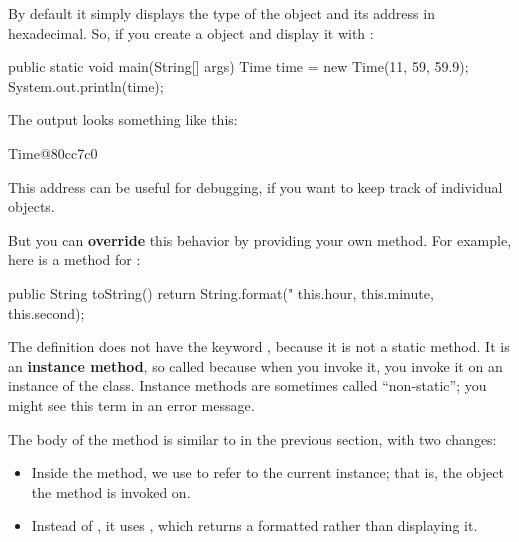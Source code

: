 
By default it simply displays the type of the object and its address in hexadecimal. 
So, if you create a  object and display it with :

\begin{code}
public static void main(String[] args) {
    Time time = new Time(11, 59, 59.9);
    System.out.println(time);
}
\end{code}


The output looks something like this:

\begin{stdout}
Time@80cc7c0
\end{stdout}


This address can be useful for debugging, if you want to keep track of individual objects.


But you can {\bf override} this behavior by providing your own  method.
For example, here is a  method for :

\begin{code}
public String toString() {
    return String.format("%
        this.hour, this.minute, this.second);
}
\end{code}


The definition does not have the keyword , because it is not a static method.
It is an {\bf instance method}, so called because when you invoke it, you invoke it on an instance of the class.
Instance methods are sometimes called ``non-static''; you might see this term in an error message.

The body of the method is similar to  in the previous section, with two changes:

\begin{itemize}

\item Inside the method, we use  to refer to the current instance; that is, the object the method is invoked on.

\item Instead of , it uses , which returns a formatted  rather than displaying it.

\end{itemize}

